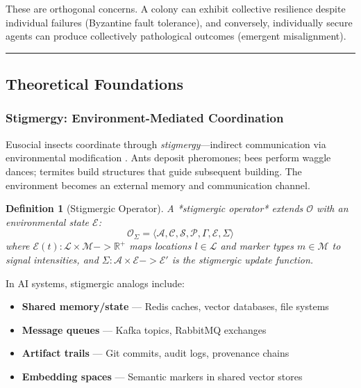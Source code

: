 \documentclass[
]{article}
\providecommand{\tightlist}{%
  \setlength{\itemsep}{0pt}\setlength{\parskip}{0pt}}
\newtheorem{definition}{Definition}[section]
\begin{document}
These are orthogonal concerns. A colony can exhibit collective
resilience despite individual failures (Byzantine fault tolerance), and
conversely, individually secure agents can produce collectively
pathological outcomes (emergent misalignment).

\begin{center}\rule{0.5\linewidth}{0.5pt}\end{center}

\subsection{Theoretical Foundations}\label{sec:eusocial-theory}

\subsubsection{Stigmergy: Environment-Mediated
Coordination}\label{sec:stigmergy}

Eusocial insects coordinate through \emph{stigmergy}---indirect
communication via environmental modification
\citep{grasse1959reconstruction}. Ants deposit pheromones; bees perform
waggle dances; termites build structures that guide subsequent building.
The environment becomes an external memory and communication channel.

\begin{definition}[Stigmergic Operator]
\label{def:stigmergic-operator}
A *stigmergic operator* extends $\mathcal{O}$ with an environmental state $\mathcal{E}$:
\begin{equation}
\label{eq:stigmergic-operator}
\mathcal{O}_\Sigma = \langle \mathcal{A}, \mathcal{C}, \mathcal{S}, \mathcal{P}, \Gamma, \mathcal{E}, \Sigma \rangle
\end{equation}
where $\mathcal{E}(t): \mathcal{L} \times \mathcal{M} -> \mathbb{R}^+$ maps locations $l \in \mathcal{L}$ and marker types $m \in \mathcal{M}$ to signal intensities, and $\Sigma: \mathcal{A} \times \mathcal{E} -> \mathcal{E}'$ is the stigmergic update function.
\end{definition}

In AI systems, stigmergic analogs include:

\begin{itemize}
\tightlist
\item
  \textbf{Shared memory/state} --- Redis caches, vector databases, file
  systems
\item
  \textbf{Message queues} --- Kafka topics, RabbitMQ exchanges
\item
  \textbf{Artifact trails} --- Git commits, audit logs, provenance
  chains
\item
  \textbf{Embedding spaces} --- Semantic markers in shared vector stores
\end{itemize}
\end{document}

